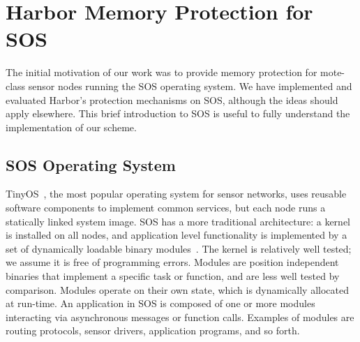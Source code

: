 \section{Harbor Memory Protection for SOS}
\label{sec:background}
% 
The initial motivation of our work was to provide memory protection
for mote-class sensor nodes running the SOS operating system.
% 
% 
We have implemented and evaluated Harbor's protection mechanisms on
SOS, although the ideas should apply elsewhere.
% 
This brief introduction to SOS is useful to fully understand the
implementation of our scheme.
% 
\subsection{SOS Operating System}
% 
% 
TinyOS~\cite{levis05t2}, the most popular operating system for sensor
networks, uses reusable software components to implement common
services, but each node runs a statically linked system image.
% 
% 
% 
SOS has a more traditional architecture: a kernel is
installed on all nodes, and
% 
application level functionality is implemented by a set of dynamically
loadable binary modules~\cite{ram05sos}.
% 
% 
% 
% 
% 
% 
% 
% 
% 
The kernel is relatively well tested; we assume it is free of
programming errors.
% 
Modules are position independent binaries that implement a specific
task or function, and are less well tested by comparison.
% 
Modules operate on their own state, which is dynamically allocated at
run-time.
% 
An application in SOS is composed of one or more modules interacting
via asynchronous messages or function calls.
% 
Examples of modules are routing protocols, sensor drivers, application
programs, and so forth.
%
